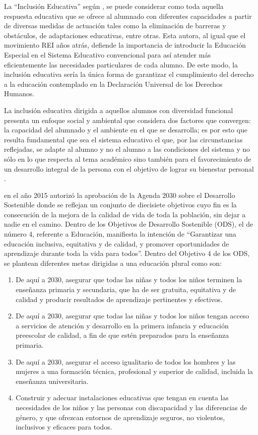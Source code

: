 \documentclass[spanish]{textolivre}
\begin{document}
La “Inclusión Educativa” según \textcite{plancarte_inclusion_2017}, se puede considerar como toda aquella respuesta educativa que se ofrece al alumnado con diferentes capacidades a partir de diversas medidas de actuación tales como la eliminación de barreras y obstáculos, de adaptaciones educativas, entre otras. Esta autora, al igual que el movimiento REI años atrás, defiende la importancia de introducir la Educación Especial en el Sistema Educativo convencional para así atender más eficientemente las necesidades particulares de cada alumno. De este modo, la inclusión educativa sería la única forma de garantizar el cumplimiento del derecho a la educación contemplado en la Declaración Universal de los Derechos Humanos.

La inclusión educativa dirigida a aquellos alumnos con diversidad funcional presenta un enfoque social y ambiental que considera dos factores que convergen: la capacidad del alumnado y el ambiente en el que se desarrolla; es por esto que resulta fundamental que sea el sistema educativo el que, por las circunstancias reflejadas, se adapte al alumno y no el alumno a las condiciones del sistema \cite{_echeita_alisis_2017} y no sólo en lo que respecta al tema académico sino también para el favorecimiento de un desarrollo integral de la persona con el objetivo de lograr su bienestar personal \cite{amor_psychoeducational_2018}.

\textcite{naciones_unidas_objetivos_nodate} en el año 2015 autorizó la aprobación de la Agenda 2030 sobre el Desarrollo Sostenible donde se reflejan un conjunto de diecisiete objetivos cuyo fin es la consecución de la mejora de la calidad de vida de toda la población, sin dejar a nadie en el camino. Dentro de los Objetivos de Desarrollo Sostenible (ODS), el de número 4, referente a Educación, manifiesta la intención de “Garantizar una educación inclusiva, equitativa y de calidad, y promover oportunidades de aprendizaje durante toda la vida para todos”. Dentro del Objetivo 4 de los ODS, se plantean diferentes metas dirigidas a una educación plural como son:

\begin{enumerate}[label=4.\arabic*.]
\item De aquí a 2030, asegurar que todas las niñas y todos los niños terminen la enseñanza primaria y secundaria, que ha de ser gratuita, equitativa y de calidad y producir resultados de aprendizaje pertinentes y efectivos.
\item De aquí a 2030, asegurar que todas las niñas y todos los niños tengan acceso a servicios de atención y desarrollo en la primera infancia y educación preescolar de calidad, a fin de que estén preparados para la enseñanza primaria.
\item De aquí a 2030, asegurar el acceso igualitario de todos los hombres y las mujeres a una formación técnica, profesional y superior de calidad, incluida la enseñanza universitaria.
\item Construir y adecuar instalaciones educativas que tengan en cuenta las necesidades de los niños y las personas con discapacidad y las diferencias de género, y que ofrezcan entornos de aprendizaje seguros, no violentos, inclusivos y eficaces para todos.
\end{enumerate}
\end{document}

